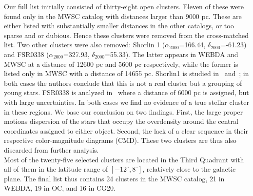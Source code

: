 \documentclass[draft]{aa}
\begin{document}
 Our full list initially consisted of thirty-eight open clusters. Eleven of
 these were found only in the MWSC catalog with distances larger than 9000 pc.
 These are either listed with substantially smaller distances in the other
 catalogs, or too sparse and or dubious. Hence these clusters were removed from
 the cross-matched list.
 Two other clusters were also removed: Shorlin 1 ($\alpha_{2000}$=166.44,
 $\delta_{2000}$=-61.23) and FSR0338
 ($\alpha_{2000}$=327.93, $\delta_{2000}$=55.33). The latter appears in WEBDA and
 MWSC at a distance of 12600 pc and 5600 pc respectively, while the former is
 listed only in MWSC with a distance of 14655 pc. Shorlin1 is studied
 in~\cite{Carraro_2009} and~\cite{Turner_2012}; in both cases the authors
 conclude that this is not a real cluster but a grouping of young stars.
 FSR0338 is analyzed in~\cite{Froebrich_2010} where a distance of 6000 pc is
 assigned, but with large uncertainties.
 In both cases we find no evidence of a true stellar cluster in these regions.
 We base our conclusion on two findings. First, the large proper motions
 dispersion of the stars that occupy the overdensity around the central
 coordinates assigned to either object. Second, the lack of a clear sequence in
 their respective color-magnitude diagrams (CMD). These two clusters are thus
 also discarded from further analysis.\\

 Most of the twenty-five selected clusters are located in the Third Quadrant
 with all of them in the latitude range of $\left[-12^{\circ}, 8^{\circ}\right]$,
 relatively close to the galactic plane. The final list thus contains 24
 clusters in the MWSC catalog, 21 in WEBDA, 19 in OC, and 16 in CG20.
\end{document}
